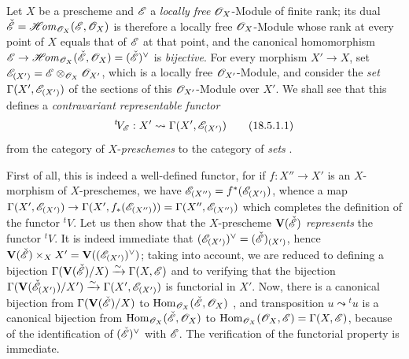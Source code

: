 \begin{env}[18.5.1]
\label{IV.18.5.1}
Let $X$ be a prescheme and $\mathscr{E}$ a \emph{locally free} $\mathscr{O}_X$-Module of finite rank; its dual $\check{\mathscr{E}}=\mathscr{H}\!\mathit{om}_{\mathscr{O}_X}(\mathscr{E},\mathscr{O}_X)$ is therefore a locally free $\mathscr{O}_X$-Module whose rank at every point of $X$ equals that of $\mathscr{E}$ at that point, and the canonical homomorphism $\mathscr{E}\to\mathscr{H}\!\mathit{om}_{\mathscr{O}_X}(\check{\mathscr{E}},\mathscr{O}_X)=(\check{\mathscr{E}})^\vee$ is \emph{bijective}.
For every morphism $X'\to X$, set $\mathscr{E}_{(X')}=\mathscr{E}\otimes_{\mathscr{O}_X}\mathscr{O}_{X'}$, which is a locally free $\mathscr{O}_{X'}$-Module, and consider the \emph{set} $\Gamma(X',\mathscr{E}_{(X')})$ of the sections of this $\mathscr{O}_{X'}$-Module over $X'$.
We shall see that this defines a \emph{contravariant representable functor}
\[
\label{IV.18.5.1.1}
{}^t\! V_{\mathscr{E}}:X'\leadsto\Gamma(X',\mathscr{E}_{(X')})
\tag{18.5.1.1}
\]
from the category of $X$-\emph{preschemes} to the category of \emph{sets} .

First of all, this is indeed a well-defined functor, for if $f:X''\to X'$ is an $X$-morphism of $X$-preschemes, we have $\mathscr{E}_{(X'')}=f^*(\mathscr{E}_{(X')})$, whence  a map $\Gamma(X',\mathscr{E}_{(X')})\to\Gamma(X',f_*(\mathscr{E}_{(X'')}))=\Gamma(X'',\mathscr{E}_{(X'')})$ which completes the definition of the functor ${}^t\! V$.
Let us then show that the $X$-prescheme $\mathbf{V}(\check{\mathscr{E}})$  \emph{represents} the functor ${}^t\! V$.
It is indeed immediate that $(\mathscr{E}_{(X')})^\vee=(\check{\mathscr{E}})_{(X')}$, hence $\mathbf{V}(\check{\mathscr{E}})\times_X X'=\mathbf{V}((\mathscr{E}_{(X')})^\vee)$; taking  into account, we are reduced to defining a bijection $\Gamma(\mathbf{V}(\check{\mathscr{E}})/X)\xrightarrow{\sim}\Gamma(X,\mathscr{E})$ and to verifying that the bijection $\Gamma(\mathbf{V}(\check{\mathscr{E}}_{(X')})/X')\xrightarrow{\sim}\Gamma(X',\mathscr{E}_{(X')})$ is functorial in $X'$.
Now, there is a canonical bijection from $\Gamma(\mathbf{V}(\check{\mathscr{E}})/X)$ to $\operatorname{Hom}_{\mathscr{O}_X}(\check{\mathscr{E}},\mathscr{O}_X)$ , and transposition $u\leadsto{}^t u$ is a canonical bijection from $\operatorname{Hom}_{\mathscr{O}_X}(\check{\mathscr{E}},\mathscr{O}_X)$ to $\operatorname{Hom}_{\mathscr{O}_X}(\mathscr{O}_X,\mathscr{E})=\Gamma(X,\mathscr{E})$, because of the identification of $(\check{\mathscr{E}})^\vee$ with $\mathscr{E}$.
The verification of the functorial property is immediate.
\end{env}

